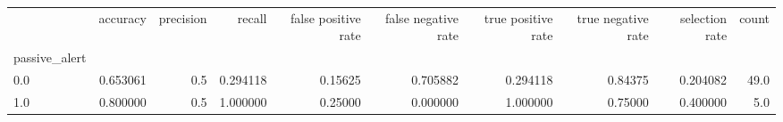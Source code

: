 \begin{tabular}{lrrrrrrrrr}
\toprule
{} &  accuracy &  precision &    recall &  false positive rate &  false negative rate &  true positive rate &  true negative rate &  selection rate &  count \\
passive\_alert &           &            &           &                      &                      &                     &                     &                 &        \\
\midrule
0.0           &  0.653061 &        0.5 &  0.294118 &              0.15625 &             0.705882 &            0.294118 &             0.84375 &        0.204082 &   49.0 \\
1.0           &  0.800000 &        0.5 &  1.000000 &              0.25000 &             0.000000 &            1.000000 &             0.75000 &        0.400000 &    5.0 \\
\bottomrule
\end{tabular}

